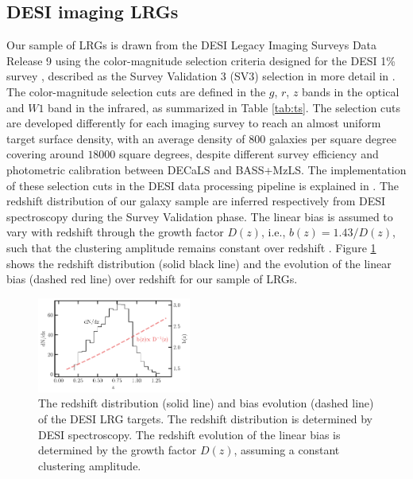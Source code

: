\subsection{DESI imaging LRGs}
Our sample of LRGs is drawn from the DESI Legacy Imaging Surveys Data Release 9 \citep[DR9;][]{dey2018overview} using the color-magnitude selection criteria designed for the DESI 1\% survey \citep{desi2023sv}, described as the Survey Validation 3 (SV3) selection in more detail in \cite{zhou2022target}. The color-magnitude selection cuts are defined in the $g$, $r$, $z$ bands in the optical and $W1$ band in the infrared, as summarized in Table \ref{tab:ts}. The selection cuts are developed differently for each imaging survey to reach an almost uniform target surface density, with an average density of $800$ galaxies per square degree covering around $18000$ square degrees, despite different survey efficiency and photometric calibration between DECaLS and BASS+MzLS. The implementation of these selection cuts in the DESI data processing pipeline is explained in \cite{myers2022}. The redshift distribution of our galaxy sample are inferred respectively from DESI spectroscopy during the Survey Validation phase. The linear bias is assumed to vary with redshift through the growth factor $D(z)$, i.e., $b(z)=1.43/D(z)$, such that the clustering amplitude remains constant over redshift \citep[see, e.g.,][]{zhou2021clustering}. Figure \ref{fig:nz} shows the redshift distribution (solid black line) and the evolution of the linear bias (dashed red line) over redshift for our sample of LRGs. 

\begin{figure}
 \centering
 \includegraphics[width=0.45\textwidth]{figures/nz_lrg.pdf}
 \caption{The redshift distribution (solid line) and bias evolution (dashed line) of the DESI LRG targets. The redshift distribution is determined by DESI spectroscopy. The redshift evolution of the linear bias is determined by the growth factor $D(z)$, assuming a constant clustering amplitude.}
 \label{fig:nz}
\end{figure}

